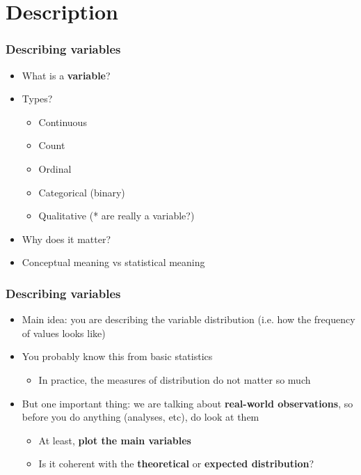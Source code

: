 \documentclass[aspectratio=43]{beamer}
\begin{document}
\section{Description}

\begin{frame}
\frametitle{Describing variables}
\centering

\begin{itemize}
  \item What is a \textbf{variable}?
  \item Types?
  \begin{itemize}
    \item<2-> Continuous
    \item<3-> Count
    \item<4-> Ordinal
    \item<5-> Categorical (binary)
    \item<6-> Qualitative (* are really a variable?)
  \end{itemize}
  \item<7-> Why does it matter?
  \item<7-> Conceptual meaning vs statistical meaning
\end{itemize}

\end{frame}

\begin{frame}
\frametitle{Describing variables}
\centering

\begin{itemize}
  \item Main idea: you are describing the variable distribution (i.e. how the frequency of values looks like)
  \item You probably know this from basic statistics
  \begin{itemize}
    \item In practice, the measures of distribution do not matter so much
  \end{itemize}
  \item But one important thing: we are talking about \textbf{real-world observations}, so before you do anything (analyses, etc), do look at them
  \begin{itemize}
    \item At least, \textbf{plot the main variables}
    \item Is it coherent with the \textbf{theoretical} or \textbf{expected distribution}?
  \end{itemize}
\end{itemize}

\end{frame}
\end{document}
